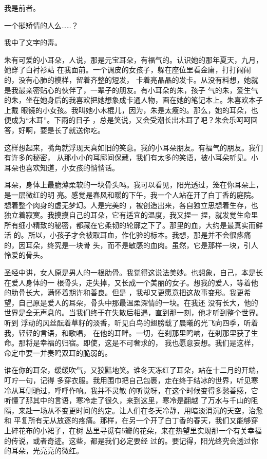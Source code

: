 \documentclass[12pt,a4paper]{article}
\begin{document}
		我是前者。

		一个挺矫情的人么……？

		我中了文字的毒。

	\endwriting



		朱有可爱的小耳朵，人说，那是元宝耳朵，有福气的。认识她的那年夏天，九月，她穿了白衬衫站
	在我面前。一个调皮的女孩子，躲在座位里看金庸，打打闹闹的，没有心肺的模样，留着齐整的短发，
	卡着亮晶晶的发卡。从没有料想，她就是我最亲密贴心的伙伴了，一辈子的朋友。有小耳朵的朱，孩子
	气的朱，爱生气的朱，坐在她身后的我喜欢把她想象成卡通人物，画在她的笔记本上。朱喜欢本子上戴
	眼镜的小女孩。我叫她小木棍儿，因为，朱是太瘦的。那么，她的耳朵，也便成为“木耳”。下雨的日子
	，总是笑说，又会受潮长出木耳了吧？朱会乐呵呵回答，好啊，要是长了就送你吃。


		这样想起来，嘴角就浮现天真如旧的笑意。我的小耳朵朋友。有福气的朋友。我们有许多的秘密，
	从那小小的耳廓间保藏，我们有太多的笑语，被小耳朵听见。小耳朵也喜欢知道，小女孩的悄悄话。


		耳朵，身体上最脆薄柔软的一块骨头吗。我可以看见，阳光透过，笼在你耳朵上，是一层微红的明
	亮。感觉是春风和暖的下午，我一个人站在开了白丁香的庭院。想着整个肉身的虚无梦幻。人是完美的
	，被创造出来，各自独立思想着生存，也独立着寂寞。我摸摸自己的耳朵，它有适宜的温度，我又捏一
	捏，就发觉生命里所有细小精致的秘密，都藏在它柔韧的轮廓之下了。那里的血，大约是最真实而鲜活
	的。所以，小孩子才会被取耳血，作化验的标本。我想，那是并不会很疼痛的，因耳朵，终究是一块骨
	头，而不是敏感的血肉。虽然，它是那样一块，引人怜爱的骨头。


		圣经中讲，女人原是男人的一根肋骨。我觉得这说法美妙。也想象，自己，本是长在爱人身体的一
	根骨头，走失掉，又长成一个美丽的女子。想我的爱人，等着他的肋骨长大，满怀着期许和善良。但是
	，我却又更愿意把这故事变形。我更希望，自己原是爱人的耳朵，骨头中那最温柔深情的一块。在我还
	没有长大，他的世界是全无声息的。当我们终于在失散后相遇，直到那一刻，他才听到整个世界。听到
	浮动的风丝酝着草籽的淡香，听见白鸟的翅膀载了晨曦的光飞向四季，听着我，轻轻的言语，和歌唱，
	在他的耳畔。一切，在刹那里鸣响，在刹那里获了生命。那将是幸福的归宿。即使，这是不可奢求的，
	我也愿意妄想。我们是这样，命定中要一并奏鸣双耳的脆弱的。


		谁在你的耳朵，缓缓吹气，又狡黠地笑。谁冬天冻红了耳朵，站在十二月的开端，叮咛一句，记得
	多穿衣服。我用围巾把自己包裹，走在终于结冰的世界，听见寒冷从耳侧驰过，呼呼作响。我并不灵敏
	的听觉呀，在这个时候变得多愁善感，它听懂了那其中的言语，寒冷走了很久，来到这里，寒冷是翻越
	了万水与千山的阻隔，来赴一场从不变更时间的约定。让人们在冬天冷静，用暗淡消沉的天空，治愈和
	平复所有无从放逐的疼痛。那样，在另一个开了白丁香的春天，我们又能够穿上碎花布的小裙子，在树
	丛里寻觅有5瓣的花朵，来在热望里实现那一个有关幸福的传说，或者奇迹。这些，都是我们必定要经
	过的。要记得，阳光终究会透过你的耳朵，光亮亮的微红。
\end{document}
